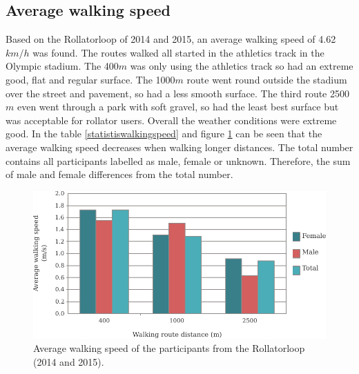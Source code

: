 \subsection{Average walking speed}\label{Rrq1b}
Based on the Rollatorloop of 2014 and 2015, an average walking speed of 4.62$km/h$ was found. The routes walked all started in the athletics track in the Olympic stadium.
The 400$m$ was only using the athletics track so had an extreme good, flat and regular surface.
The 1000$m$ route went round outside the stadium over the street and pavement, so had a less smooth surface. The third route 2500$m$ even went through a park with soft gravel, so had the least best surface but was acceptable for rollator users. 
Overall the weather conditions were extreme good. 
In the table \ref{statistiswalkingspeed} and figure \ref{averagewalkingspeed} can be seen that the average walking speed decreases when walking longer distances. 
The total number contains all participants labelled as male, female or unknown. Therefore, the sum of male and female differences from the total number.

\begin{figure}[h]
\includegraphics[width=\textwidth]{img/R_averageWalkingSpeed.pdf}
\centering
\caption{Average walking speed of the participants from the Rollatorloop (2014 and 2015). \label{averagewalkingspeed}}
\end{figure}

